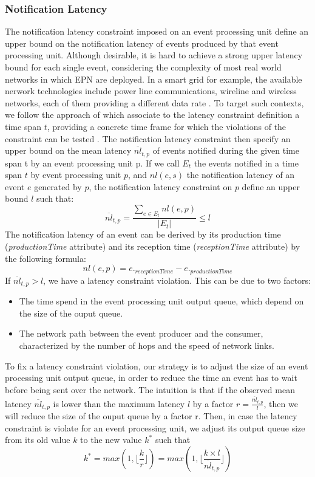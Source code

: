 \documentclass[a4paper,twoside]{article}
\begin{document}
\subsubsection{Notification Latency}
The notification latency constraint imposed on an event processing unit define an upper bound on the notification latency of events produced by that event processing unit. Although desirable, it is hard to achieve a strong upper latency bound for each single event, considering the complexity of most real world networks in which EPN are deployed. In a smart grid for example, the available nerwork technologies include power line communications, wireline and wireless networks, each of them providing a different data rate \cite{Wang2011} . To target such contexts, we follow the approach of \cite{Lohrmann2013} which associate to the latency constraint definition a time span $t$, providing a concrete time frame for which the violations of the constraint can be tested . The notification latency constraint then specify an upper bound on the mean latency $\overline{nl}_{t,p}$ of events notified during the given time span t by an event processing unit p. If we call $E_t$ the events notified in a time span $t$  by event processing unit $p$, and $nl(e, s)$ the notification latency of an event $e$ generated by $p$, the notification latency constraint on $p$ define an upper bound $l$ such that:
\begin{equation}\label{eq1}
\overline{nl}_{t,p} = \frac{\sum_{e \in E_t} nl(e,p)}{|E_t|} \leq l
\end{equation} 
The notification latency of an event can be derived by its production time (\textit{productionTime} attribute) and its reception time (\textit{receptionTime} attribute) by the following formula:
\begin{equation}\label{eq2}
nl(e,p) = e._{receptionTime} - e._{productionTime}
\end{equation} 
If $\overline{nl}_{t,p} > l$, we have a latency constraint violation. This can be due to two factors:
\begin{itemize}
\item The time spend in the event processing unit output queue, which depend on the size of the ouput queue.
\item The network path between the event producer and the consumer, characterized by the number of hops and the speed of network links.
\end{itemize}
To fix a latency constraint violation, our strategy is to adjust the size of an event processing unit output queue, in order to reduce the time an event has to wait before being sent over the network. The intuition is that if the observed mean latency $\overline{nl}_{t,p}$ is lower than the maximum latency $l$ by a factor $r = \frac{\overline{nl}_{t,p}}{l}$, then we will reduce the size of the ouput queue by a factor r. Then, in case the latency constraint is violate for an event processing unit, we adjust its output queue size from its old value $k$ to the new value $k^*$ such that
\begin{equation}\label{eq3} 
 k^* = max(1,\lfloor \frac{k}{r} \rfloor) = max(1, \lfloor \frac{k \times{l}}{\overline{nl}_{t,p}} \rfloor)
 \end{equation}
\end{document}
